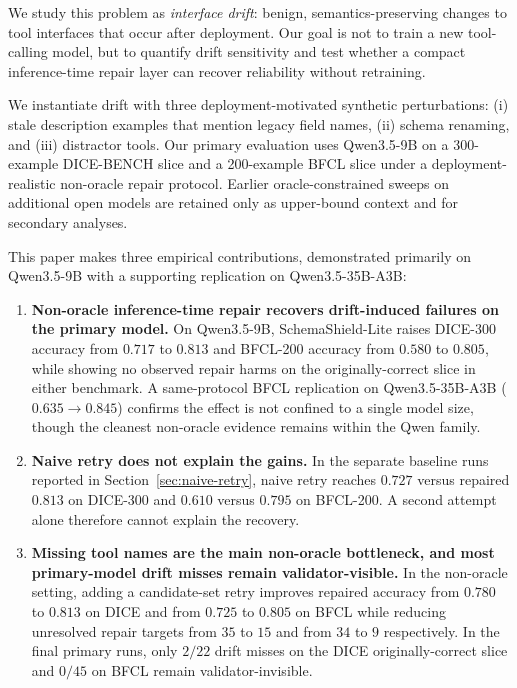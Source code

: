 \documentclass{svproc}
\newcommand{\method}{SchemaShield-Lite\xspace}
\begin{document}
We study this problem as \emph{interface drift}: benign, semantics-preserving
changes to tool interfaces that occur after deployment. Our goal is not to train a
new tool-calling model, but to quantify drift sensitivity and test whether a compact
inference-time repair layer can recover reliability without retraining.

We instantiate drift with three deployment-motivated synthetic perturbations: (i)
stale description examples that mention legacy field names, (ii) schema renaming,
and (iii) distractor tools. Our primary evaluation uses Qwen3.5-9B on a
300-example DICE-BENCH slice \cite{jang2025dicebench} and a 200-example BFCL
slice \cite{bfcl2024} under a deployment-realistic non-oracle repair protocol.
Earlier oracle-constrained sweeps on additional open models are retained only as
upper-bound context and for secondary analyses.

This paper makes three empirical contributions, demonstrated primarily on
Qwen3.5-9B with a supporting replication on Qwen3.5-35B-A3B:

\begin{enumerate}
\item \textbf{Non-oracle inference-time repair recovers drift-induced failures on
the primary model.} On Qwen3.5-9B, \method raises DICE-300 accuracy from $0.717$
to $0.813$ and BFCL-200 accuracy from $0.580$ to $0.805$, while showing no
observed repair harms on the originally-correct slice in either benchmark. A
same-protocol BFCL replication on Qwen3.5-35B-A3B ($0.635 \rightarrow 0.845$)
confirms the effect is not confined to a single model size, though the cleanest
non-oracle evidence remains within the Qwen family.

\item \textbf{Naive retry does not explain the gains.} In the separate baseline
runs reported in Section~\ref{sec:naive-retry}, naive retry reaches $0.727$
versus repaired $0.813$ on DICE-300 and $0.610$ versus $0.795$ on BFCL-200.
A second attempt alone therefore cannot explain the recovery.

\item \textbf{Missing tool names are the main non-oracle bottleneck, and most
primary-model drift misses remain validator-visible.} In the non-oracle setting,
adding a candidate-set retry improves repaired accuracy from $0.780$ to $0.813$ on
DICE and from $0.725$ to $0.805$ on BFCL while reducing unresolved repair targets
from $35$ to $15$ and from $34$ to $9$ respectively. In the final primary runs,
only $2/22$ drift misses on the DICE originally-correct slice and $0/45$ on BFCL
remain validator-invisible.
\end{enumerate}
\end{document}
